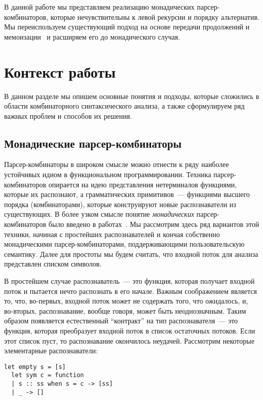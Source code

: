 \documentclass[conference]{IEEEtran}
\begin{document}
В данной работе мы представляем реализацию монадических парсер-комбинаторов, которые нечувствительны к левой рекурсии и порядку альтернатив. Мы переиспользуем
существующий подход на основе передачи продолжений и мемоизации~\cite{meerkat} и расширяем его до монадического случая.

\section{Контекст работы}

В данном разделе мы опишем основные понятия и подходы, которые сложились в области комбинаторного синтаксического анализа, а также сформулируем ряд важных проблем и
способов их решения.

\subsection{Монадические парсер-комбинаторы}

Парсер-комбинаторы в широком смысле можно отнести к ряду наиболее устойчивых идиом в функциональном программировании. Техника парсер-комбинаторов опирается на идею
представления нетерминалов функциями, которые их распознают, а грамматических примитивов~--- функциями высшего порядка (комбинаторами), которые конструируют новые
распознаватели из существующих. В более узком смысле понятие \emph{монадических} парсер-комбинаторов было введено в работах~\cite{meijer,wadler}. Мы рассмотрим здесь ряд вариантов
этой техники, начиная с простейших распознавателей и кончая собственно монадическими парсер-комбинаторами, поддерживающими пользовательскую семантику. Далее для простоты
мы будем считать, что входной поток для анализа представлен списком символов.

В простейшем случае распознаватель~--- это функция, которая получает входной поток и пытается нечто распознать в его начале. Важным соображением является то, что, во-первых,
входной поток может не содержать того, что ожидалось, и, во-вторых, распознавание, вообще говоря, может быть неоднозначным. Таким образом появляется естественный ``контракт''
на тип распознавателя~--- это функция, которая преобразует входной поток в список остаточных потоков. Если этот список пуст, то распознавание окончилось неудачей.
Рассмотрим некоторые элементарные распознаватели:

\begin{lstlisting}[basicstyle=\small]
  let empty s = [s]
  let sym c = function
  | s :: ss when s = c -> [ss]
  | _ -> []
\end{lstlisting}
\end{document}

